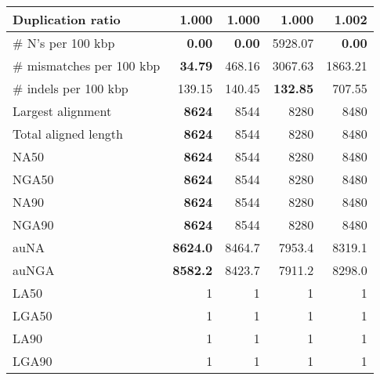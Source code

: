 \documentclass[12pt,a4paper]{article}
\begin{document}
\begin{table}[ht]
\begin{center}
\begin{tabular}{|l*{4}{|r}|}
Duplication ratio & {\bf 1.000} & {\bf 1.000} & {\bf 1.000} & 1.002 \\ \hline
\# N's per 100 kbp & {\bf 0.00} & {\bf 0.00} & 5928.07 & {\bf 0.00} \\ \hline
\# mismatches per 100 kbp & {\bf 34.79} & 468.16 & 3067.63 & 1863.21 \\ \hline
\# indels per 100 kbp & 139.15 & 140.45 & {\bf 132.85} & 707.55 \\ \hline
Largest alignment & {\bf 8624} & 8544 & 8280 & 8480 \\ \hline
Total aligned length & {\bf 8624} & 8544 & 8280 & 8480 \\ \hline
NA50 & {\bf 8624} & 8544 & 8280 & 8480 \\ \hline
NGA50 & {\bf 8624} & 8544 & 8280 & 8480 \\ \hline
NA90 & {\bf 8624} & 8544 & 8280 & 8480 \\ \hline
NGA90 & {\bf 8624} & 8544 & 8280 & 8480 \\ \hline
auNA & {\bf 8624.0} & 8464.7 & 7953.4 & 8319.1 \\ \hline
auNGA & {\bf 8582.2} & 8423.7 & 7911.2 & 8298.0 \\ \hline
LA50 & 1 & 1 & 1 & 1 \\ \hline
LGA50 & 1 & 1 & 1 & 1 \\ \hline
LA90 & 1 & 1 & 1 & 1 \\ \hline
LGA90 & 1 & 1 & 1 & 1 \\ \hline
\end{tabular}
\end{center}
\end{table}
\end{document}
